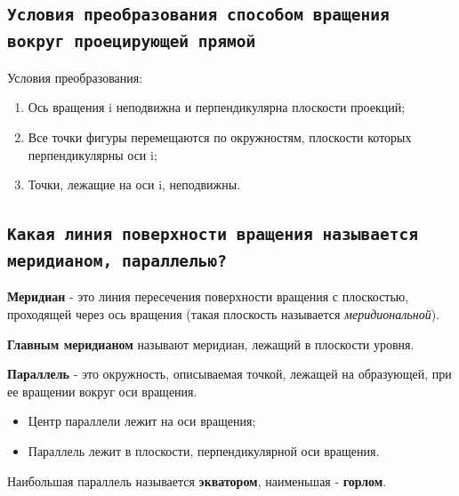 
\newpage
\subsection{\texttt{Условия преобразования способом вращения вокруг проецирующей прямой}}

\begin{myquote}
    
\end{myquote}

Условия преобразования:
\begin{enumerate}
    \item Ось вращения i неподвижна и перпендикулярна плоскости проекций;
    \item Все точки фигуры перемещаются по окружностям, плоскости которых перпендикулярны оси i;
    \item Точки, лежащие на оси i, неподвижны.
\end{enumerate}


\newpage
\subsection{\texttt{Какая линия поверхности вращения называется меридианом, параллелью?}}

\begin{myquote}
\end{myquote}
{\bf Меридиан} - это линия пересечения поверхности вращения с плоскостью, проходящей через ось вращения (такая плоскость называется \textit {меридиональной}).

{\bf Главным меридианом} называют меридиан, лежащий в плоскости уровня.

{\bf Параллель} - это окружность, описываемая точкой, лежащей на образующей, при ее вращении вокруг оси вращения. 
\begin{itemize}
    \item Центр параллели лежит на оси вращения; 
    \item Параллель лежит в плоскости, перпендикулярной оси вращения.
\end{itemize}

Наибольшая параллель называется {\bf экватором}, наименьшая - {\bf горлом}.


